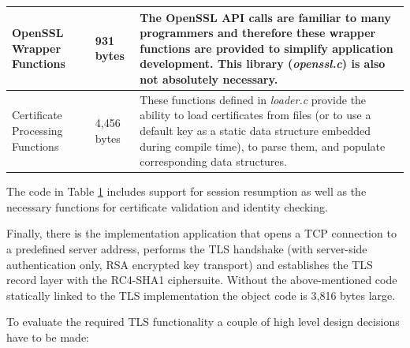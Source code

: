 \documentclass[a4paper, 10pt]{IEEEtran}
\begin{document}
\begin{table}[htdp]
\begin{center}
\begin{tabular}{|p{1cm}|p{}|p{}|}
\hline\hline
OpenSSL Wrapper Functions & 931 bytes & The OpenSSL API calls are familiar to many programmers and therefore these wrapper functions are provided to simplify application development. This library (\textit{openssl.c}) is also not absolutely necessary.\\ 
\hline\hline
Certificate Processing Functions & 4,456 bytes & These functions defined in \textit{loader.c} provide the ability to load certificates from files (or to use a default key as a static data structure embedded during compile time), to parse them, and populate corresponding data structures. \\
\hline
\end{tabular}
\end{center}
\label{tls-code-table}
\end{table}
The code in Table \ref{tls-code-table} includes support for session resumption as well as the necessary functions for certificate validation and identity checking. 

Finally, there is the implementation application that opens a TCP connection to a predefined server address, performs the TLS handshake (with server-side authentication only, RSA encrypted key transport) and establishes the TLS record layer with the RC4-SHA1 ciphersuite. Without the above-mentioned code statically linked to the TLS implementation the object code is 3,816 bytes large. 


To evaluate the required TLS functionality a couple of high level design decisions have to be made:
\end{document}
